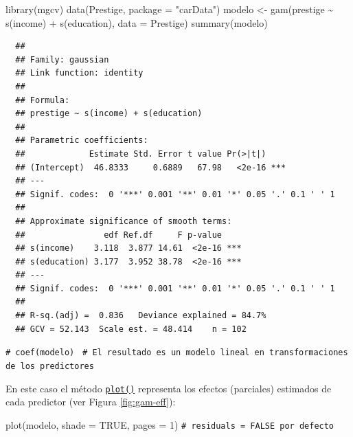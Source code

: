 \documentclass[
]{book}
\newenvironment{Shaded}{\begin{snugshade}}{\end{snugshade}}
\newcommand{\AttributeTok}[1]{\textcolor[rgb]{0.77,0.63,0.00}{#1}}
\newcommand{\CommentTok}[1]{\textcolor[rgb]{0.56,0.35,0.01}{\textit{#1}}}
\newcommand{\ConstantTok}[1]{\textcolor[rgb]{0.00,0.00,0.00}{#1}}
\newcommand{\DecValTok}[1]{\textcolor[rgb]{0.00,0.00,0.81}{#1}}
\newcommand{\FunctionTok}[1]{\textcolor[rgb]{0.00,0.00,0.00}{#1}}
\newcommand{\NormalTok}[1]{#1}
\newcommand{\OtherTok}[1]{\textcolor[rgb]{0.56,0.35,0.01}{#1}}
\newcommand{\SpecialCharTok}[1]{\textcolor[rgb]{0.00,0.00,0.00}{#1}}
\newcommand{\StringTok}[1]{\textcolor[rgb]{0.31,0.60,0.02}{#1}}
\theoremstyle{break}
\theoremstyle{nonumberplain}
\renewcommand{\CommentTok}[1]{\textcolor[rgb]{0.41,0.41,0.41}{\texttt{#1}}}
\begin{document}
\begin{Shaded}
\begin{Highlighting}[]
\FunctionTok{library}\NormalTok{(mgcv)}
\FunctionTok{data}\NormalTok{(Prestige, }\AttributeTok{package =} \StringTok{"carData"}\NormalTok{)}
\NormalTok{modelo }\OtherTok{\textless{}{-}} \FunctionTok{gam}\NormalTok{(prestige }\SpecialCharTok{\textasciitilde{}} \FunctionTok{s}\NormalTok{(income) }\SpecialCharTok{+} \FunctionTok{s}\NormalTok{(education), }\AttributeTok{data =}\NormalTok{ Prestige)}
\FunctionTok{summary}\NormalTok{(modelo)}
\end{Highlighting}
\end{Shaded}

\begin{verbatim}
  ## 
  ## Family: gaussian 
  ## Link function: identity 
  ## 
  ## Formula:
  ## prestige ~ s(income) + s(education)
  ## 
  ## Parametric coefficients:
  ##             Estimate Std. Error t value Pr(>|t|)    
  ## (Intercept)  46.8333     0.6889   67.98   <2e-16 ***
  ## ---
  ## Signif. codes:  0 '***' 0.001 '**' 0.01 '*' 0.05 '.' 0.1 ' ' 1
  ## 
  ## Approximate significance of smooth terms:
  ##                edf Ref.df     F p-value    
  ## s(income)    3.118  3.877 14.61  <2e-16 ***
  ## s(education) 3.177  3.952 38.78  <2e-16 ***
  ## ---
  ## Signif. codes:  0 '***' 0.001 '**' 0.01 '*' 0.05 '.' 0.1 ' ' 1
  ## 
  ## R-sq.(adj) =  0.836   Deviance explained = 84.7%
  ## GCV = 52.143  Scale est. = 48.414    n = 102
\end{verbatim}

\begin{Shaded}
\begin{Highlighting}[]
\CommentTok{\# coef(modelo) }
\CommentTok{\# El resultado es un modelo lineal en transformaciones de los predictores}
\end{Highlighting}
\end{Shaded}

En este caso el método \href{https://rdrr.io/pkg/mgcv/man/plot.gam.html}{\texttt{plot()}} representa los efectos (parciales) estimados de cada predictor (ver Figura \ref{fig:gam-eff}):



\begin{Shaded}
\begin{Highlighting}[]
\FunctionTok{plot}\NormalTok{(modelo, }\AttributeTok{shade =} \ConstantTok{TRUE}\NormalTok{, }\AttributeTok{pages =} \DecValTok{1}\NormalTok{) }\CommentTok{\# residuals = FALSE por defecto}
\end{Highlighting}
\end{Shaded}
\end{document}
